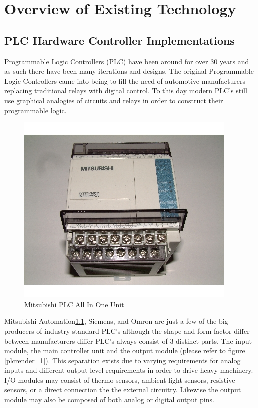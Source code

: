 
\chapter{Overview of Existing Technology}
\section{PLC Hardware Controller Implementations}
Programmable Logic Controllers (PLC) have been around for over 30 years and as such there have been many iterations and designs. The original Programmable Logic Controllers came into being to fill the need of automotive manufacturers replacing traditional relays with digital control. To this day modern PLC's still use graphical analogies of circuits and relays in order to construct their programmable logic.

\begin{figure}[htp]
    \centering
    \includegraphics[width=\imgmedphoto]{./images/c01_mitsubishiplc.jpg}
    \caption{Mitsubishi PLC All In One Unit \cite{img_c01_MitsubishiPlc}}
    \label{img:mitsubishiplc}
\end{figure}

Mitsubishi Automation\ref{img:mitsubishiplc}, Siemens, and Omron are just a few of the big producers of industry standard PLC's although the shape and form factor differ between manufacturers differ PLC's always consist of 3 distinct parts.  The input module, the main controller unit and the output module (please refer to figure \ref{plcrender_1}). This separation exists due to varying requirements for analog inputs and different output level requirements in order to drive heavy machinery. I/O modules may consist of thermo sensors, ambient light sensors, resistive sensors, or a direct connection the the external circuitry. Likewise the output module may also be composed of both analog or digital output pins.

